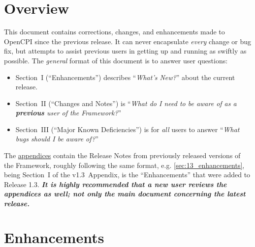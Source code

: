 \section*{Overview}
This document contains corrections, changes, and enhancements made to OpenCPI since the previous release. It can never encapsulate \textit{every} change or bug fix, but attempts to assist previous users in getting up and running as swiftly as possible. The \textit{general} format of this document is to answer user questions:
\begin{itemize}
\item Section~I (``Enhancements'') describes ``\textit{What's New?}'' about the current release.
\item Section~II (``Changes and Notes'') is ``\textit{What do I need to be aware of as a \textbf{previous} user of the Framework?}''
\item Section~III (``Major Known Deficiencies'') is for \textit{all} users to answer ``\textit{What bugs should I be aware of?}''
\end{itemize}
The \href{sec:appendices}{appendices} contain the Release Notes from previously released versions of the Framework, roughly following the same format, e.g. \ref{sec:13_enhancements}, being Section~I of the v1.3~Appendix, is the ``Enhancements'' that were added to Release 1.3. \textit{\textbf{It is highly recommended that a new user reviews the appendices as well; not only the main document concerning the latest release.}}

\iffalse
\section{Enhancements}
\section{Changes and Notes}
\section{Major Known Deficiencies}
\label{sec:XX_bugs}
\subsection{Previously Documented Deficiencies}
\fi

\section{Enhancements}
